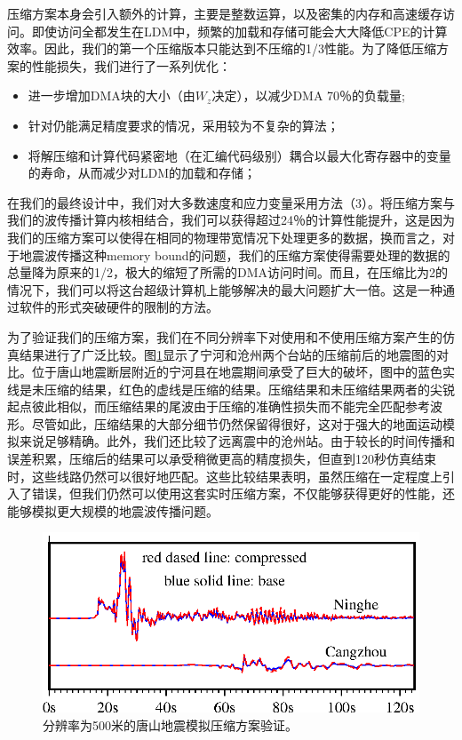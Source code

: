 \documentclass[degree=doctor]{thuthesis}
\begin{document}
压缩方案本身会引入额外的计算，主要是整数运算，以及密集的内存和高速缓存访问。即使访问全都发生在LDM中，频繁的加载和存储可能会大大降低CPE的计算效率。因此，我们的第一个压缩版本只能达到不压缩的1/3性能。为了降低压缩方案的性能损失，我们进行了一系列优化：

\begin{itemize}
  \item 进一步增加DMA块的大小（由$ W_z $决定），以减少DMA 70％的负载量;
  \item 针对仍能满足精度要求的情况，采用较为不复杂的算法；
  \item 将解压缩和计算代码紧密地（在汇编代码级别）耦合以最大化寄存器中的变量的寿命，从而减少对LDM的加载和存储；
\end{itemize}

在我们的最终设计中，我们对大多数速度和应力变量采用方法（3）。将压缩方案与我们的波传播计算内核相结合，我们可以获得超过24％的计算性能提升，这是因为我们的压缩方案可以使得在相同的物理带宽情况下处理更多的数据，换而言之，对于地震波传播这种memory bound的问题，我们的压缩方案使得需要处理的数据的总量降为原来的1/2，极大的缩短了所需的DMA访问时间。而且，在压缩比为2的情况下，我们可以将这台超级计算机上能够解决的最大问题扩大一倍。这是一种通过软件的形式突破硬件的限制的方法。


为了验证我们的压缩方案，我们在不同分辨率下对使用和不使用压缩方案产生的仿真结果进行了广泛比较。图\ref {fig:compress_valid}显示了宁河和沧州两个台站的压缩前后的地震图的对比。位于唐山地震断层附近的宁河县在地震期间承受了巨大的破坏，图中的蓝色实线是未压缩的结果，红色的虚线是压缩的结果。压缩结果和未压缩结果两者的尖锐起点彼此相似，而压缩结果的尾波由于压缩的准确性损失而不能完全匹配参考波形。尽管如此，压缩结果的大部分细节仍然​​保留得很好，这对于强大的地面运动模拟来说足够精确。此外，我们还比较了远离震中的沧州站。由于较长的时间传播和误差积累，压缩后的结果可以承受稍微更高的精度损失，但直到120秒仿真结束时，这些线路仍然可以很好地匹配。这些比较结果表明，虽然压缩在一定程度上引入了错误，但我们仍然可以使用这套实时压缩方案，不仅能够获得更好的性能，还能够模拟更大规模的地震波传播问题。

\begin{figure}[ht]
\centering
\includegraphics[width=0.9\columnwidth]{CompareCompress.eps}
\caption{分辨率为500米的唐山地震模拟压缩方案验证。}
\label{fig:compress_valid}
\end{figure}
\end{document}
